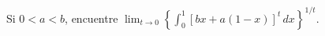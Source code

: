 \item Si $0 < a < b$, encuentre $\displaystyle\lim_{t \to 0} \left\{ \int_0^1 [bx + a(1 - x)]^t \, dx \right\}^{1/t}$.
